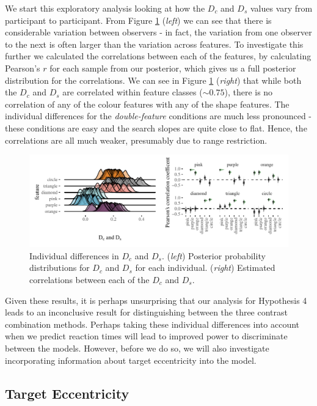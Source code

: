 \documentclass[preprint,12pt,authoryear]{elsarticle}
\begin{document}
We start this exploratory analysis looking at how the $D_c$ and $D_s$ values vary from participant to participant. From Figure \ref{fig:exp_corr} (\textit{left}) we can see that there is considerable variation between observers - in fact, the variation from one observer to the next is often larger than the variation across features. To investigate this further we calculated the correlations between each of the features, by  calculating Pearson's $r$ for each sample from our posterior, which gives us a full posterior distribution for the correlations. We can see in Figure \ref{fig:exp_corr} (\textit{right}) that while both the $D_c$ and $D_s$ are correlated within feature classes ($\sim0.75$), there is no correlation of any of the colour features with any of the shape features. The individual differences for the \textit{double-feature} conditions are much less pronounced - these conditions are easy and the search slopes are quite close to flat. Hence, the correlations are all much weaker, presumably due to range restriction. 

\begin{figure}[ht]
\centering
\includegraphics[width=\textwidth]{../plots/single_feature_correlations.pdf}
\caption{Individual differences in $D_c$ and $D_s$. (\textit{left}) Posterior probability distributions for $D_c$ and $D_s$ for each individual. (\textit{right}) Estimated correlations between each of the $D_c$ and $D_s$.}
\label{fig:exp_corr}
\end{figure}

Given these results, it is perhaps unsurprising that our analysis for Hypothesis 4 leads to an inconclusive result for distinguishing between the three contrast combination methods. Perhaps taking these individual differences into account when we predict reaction times will lead to improved power to discriminate between the models. However, before we do so, we will also investigate incorporating information about target eccentricity into the model.

\subsection{Target Eccentricity}
\end{document}

